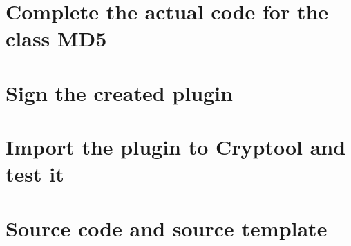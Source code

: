 \section{Complete the actual code for the class MD5}\label{sec:CompleteTheActualCodeForTheClassMD5}
\section{Sign the created plugin}\label{sec:SignTheCreatedPlugin}
\section{Import the plugin to Cryptool and test it}\label{sec:ImportThePluginToCryptoolAndTestIt}
\section{Source code and source template}\label{sec:SourceCodeAndSourceTemplate}
